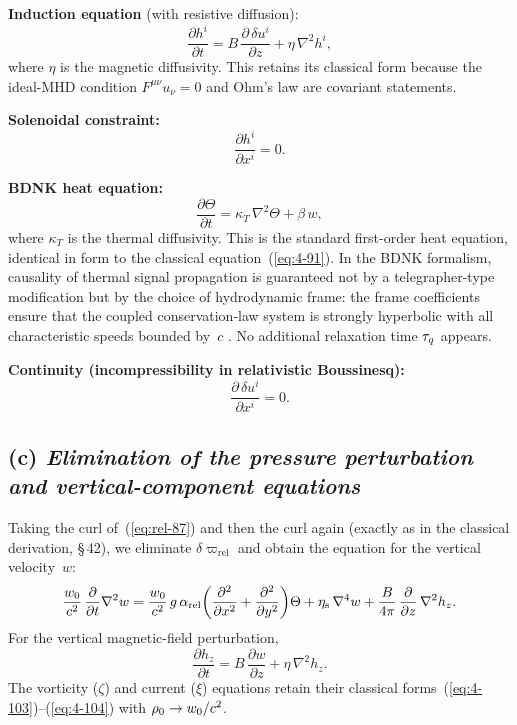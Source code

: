 \medskip
\noindent\textbf{Induction equation} (with resistive diffusion):
\begin{equation}\label{eq:rel-89}
  \frac{\partial h^{i}}{\partial t}
  = B\,\frac{\partial\,\delta u^{i}}{\partial z}
    + \eta\,\nabla^{2}h^{i},
\end{equation}
where $\eta$ is the magnetic diffusivity.  This retains its
classical form because the ideal-MHD condition
$F^{\mu\nu}u_{\nu}=0$ and Ohm's law are covariant statements.

\medskip
\noindent\textbf{Solenoidal constraint:}
\begin{equation}\label{eq:rel-90}
  \frac{\partial h^{i}}{\partial x^{i}} = 0.
\end{equation}

\medskip
\noindent\textbf{BDNK heat equation:}
\begin{equation}\label{eq:rel-91}
  \frac{\partial\Theta}{\partial t}
  = \kappa_{T}\,\nabla^{2}\Theta + \beta\,w,
\end{equation}
where $\kappa_{T}$ is the thermal diffusivity.
This is the standard first-order heat equation, identical in form to the
classical equation~(\ref{eq:4-91}).  In the BDNK formalism, causality of
thermal signal propagation is guaranteed not by a telegrapher-type
modification but by the choice of hydrodynamic frame: the frame
coefficients ensure that the coupled conservation-law system is strongly
hyperbolic with all characteristic speeds bounded by~$c$
\citep{BemficaDN2018,Kovtun2019,HoultKovtun2020}.  No additional relaxation
time $\tau_{q}$ appears.

\medskip
\noindent\textbf{Continuity (incompressibility in relativistic
  Boussinesq):}
\begin{equation}\label{eq:rel-92}
  \frac{\partial\,\delta u^{i}}{\partial x^{i}} = 0.
\end{equation}

\subsection*{(c) \emph{Elimination of the pressure perturbation and
  vertical-component equations}}

Taking the curl of~(\ref{eq:rel-87}) and then the curl again
(exactly as in the classical derivation, \S\,42), we eliminate
$\delta\varpi_{\text{rel}}$ and obtain the equation for the vertical
velocity~$w$:
\begin{equation}\label{eq:rel-105}
  \frac{w_{0}}{c^{2}}\,\frac{\partial}{\partial t}\nabla^{2}w
  = \frac{w_{0}}{c^{2}}\,g\,\alpha_{\text{rel}}
    \biggl(\frac{\partial^{2}}{\partial x^{2}}
           +\frac{\partial^{2}}{\partial y^{2}}\biggr)\Theta
  + \eta_{\mathrm{s}}\,\nabla^{4}w
  + \frac{B}{4\pi}\,\frac{\partial}{\partial z}\,\nabla^{2}h_{z}.
\end{equation}
For the vertical magnetic-field perturbation,
\begin{equation}\label{eq:rel-102}
  \frac{\partial h_{z}}{\partial t}
  = B\,\frac{\partial w}{\partial z}+\eta\,\nabla^{2}h_{z}.
\end{equation}
The vorticity ($\zeta$) and current ($\xi$) equations retain
their classical forms~(\ref{eq:4-103})--(\ref{eq:4-104}) with
$\rho_{0}\to w_{0}/c^{2}$.


